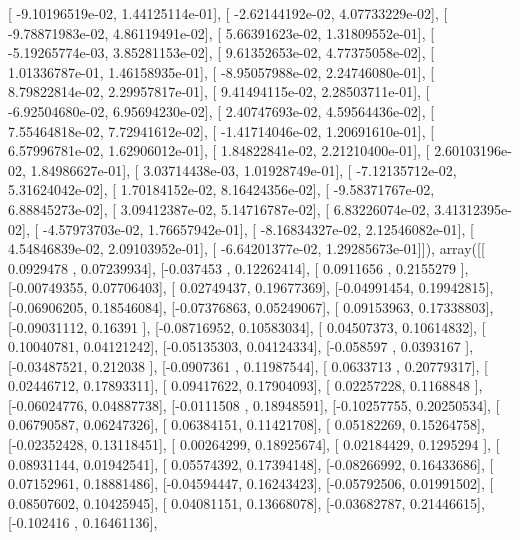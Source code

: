 \documentclass{article}
\begin{document}
       [ -9.10196519e-02,   1.44125114e-01],
       [ -2.62144192e-02,   4.07733229e-02],
       [ -9.78871983e-02,   4.86119491e-02],
       [  5.66391623e-02,   1.31809552e-01],
       [ -5.19265774e-03,   3.85281153e-02],
       [  9.61352653e-02,   4.77375058e-02],
       [  1.01336787e-01,   1.46158935e-01],
       [ -8.95057988e-02,   2.24746080e-01],
       [  8.79822814e-02,   2.29957817e-01],
       [  9.41494115e-02,   2.28503711e-01],
       [ -6.92504680e-02,   6.95694230e-02],
       [  2.40747693e-02,   4.59564436e-02],
       [  7.55464818e-02,   7.72941612e-02],
       [ -1.41714046e-02,   1.20691610e-01],
       [  6.57996781e-02,   1.62906012e-01],
       [  1.84822841e-02,   2.21210400e-01],
       [  2.60103196e-02,   1.84986627e-01],
       [  3.03714438e-03,   1.01928749e-01],
       [ -7.12135712e-02,   5.31624042e-02],
       [  1.70184152e-02,   8.16424356e-02],
       [ -9.58371767e-02,   6.88845273e-02],
       [  3.09412387e-02,   5.14716787e-02],
       [  6.83226074e-02,   3.41312395e-02],
       [ -4.57973703e-02,   1.76657942e-01],
       [ -8.16834327e-02,   2.12546082e-01],
       [  4.54846839e-02,   2.09103952e-01],
       [ -6.64201377e-02,   1.29285673e-01]]), array([[ 0.0929478 ,  0.07239934],
       [-0.037453  ,  0.12262414],
       [ 0.0911656 ,  0.2155279 ],
       [-0.00749355,  0.07706403],
       [ 0.02749437,  0.19677369],
       [-0.04991454,  0.19942815],
       [-0.06906205,  0.18546084],
       [-0.07376863,  0.05249067],
       [ 0.09153963,  0.17338803],
       [-0.09031112,  0.16391   ],
       [-0.08716952,  0.10583034],
       [ 0.04507373,  0.10614832],
       [ 0.10040781,  0.04121242],
       [-0.05135303,  0.04124334],
       [-0.058597  ,  0.0393167 ],
       [-0.03487521,  0.212038  ],
       [-0.0907361 ,  0.11987544],
       [ 0.0633713 ,  0.20779317],
       [ 0.02446712,  0.17893311],
       [ 0.09417622,  0.17904093],
       [ 0.02257228,  0.1168848 ],
       [-0.06024776,  0.04887738],
       [-0.0111508 ,  0.18948591],
       [-0.10257755,  0.20250534],
       [ 0.06790587,  0.06247326],
       [ 0.06384151,  0.11421708],
       [ 0.05182269,  0.15264758],
       [-0.02352428,  0.13118451],
       [ 0.00264299,  0.18925674],
       [ 0.02184429,  0.1295294 ],
       [ 0.08931144,  0.01942541],
       [ 0.05574392,  0.17394148],
       [-0.08266992,  0.16433686],
       [ 0.07152961,  0.18881486],
       [-0.04594447,  0.16243423],
       [-0.05792506,  0.01991502],
       [ 0.08507602,  0.10425945],
       [ 0.04081151,  0.13668078],
       [-0.03682787,  0.21446615],
       [-0.102416  ,  0.16461136],
\end{document}
